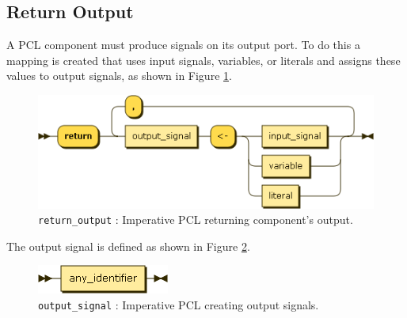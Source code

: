 \clearpage

\subsection{Return Output}
A PCL component must produce signals on its output port. To do this a mapping is created that uses input signals, variables, or literals and assigns these values to output signals, as shown in Figure \ref{fig:imperative-pcl-return-output}.
\begin{figure}[h!]
  \centering
    \includegraphics[scale=\DiagramScale]{chapters/adapter/diagrams/return_output}
  \caption{\texttt{return\_output} : Imperative PCL returning component's output.}
  \label{fig:imperative-pcl-return-output}
\end{figure}

The output signal is defined as shown in Figure \ref{fig:imperative-pcl-return-output-signal}.
\begin{figure}[h!]
  \centering
    \includegraphics[scale=\DiagramScale]{chapters/adapter/diagrams/output_signal}
  \caption{\texttt{output\_signal} : Imperative PCL creating output signals.}
  \label{fig:imperative-pcl-return-output-signal}
\end{figure}

\clearpage

